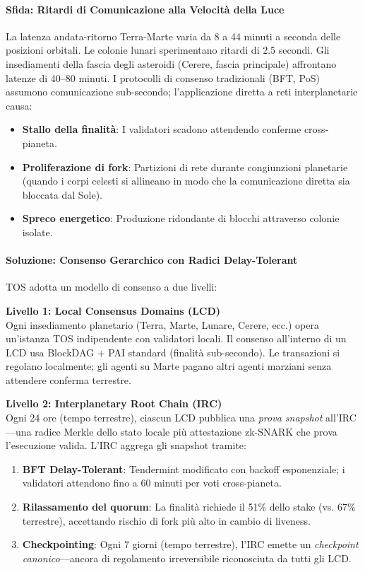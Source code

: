 \documentclass[11pt]{article}
\begin{document}
\paragraph{Sfida: Ritardi di Comunicazione alla Velocità della Luce}
La latenza andata-ritorno Terra-Marte varia da 8 a 44 minuti a seconda delle posizioni orbitali. Le colonie lunari sperimentano ritardi di 2.5 secondi. Gli insediamenti della fascia degli asteroidi (Cerere, fascia principale) affrontano latenze di 40--80 minuti. I protocolli di consenso tradizionali (BFT, PoS) assumono comunicazione sub-secondo; l'applicazione diretta a reti interplanetarie causa:
\begin{itemize}[noitemsep]
  \item \textbf{Stallo della finalità}: I validatori scadono attendendo conferme cross-pianeta.
  \item \textbf{Proliferazione di fork}: Partizioni di rete durante congiunzioni planetarie (quando i corpi celesti si allineano in modo che la comunicazione diretta sia bloccata dal Sole).
  \item \textbf{Spreco energetico}: Produzione ridondante di blocchi attraverso colonie isolate.
\end{itemize}

\paragraph{Soluzione: Consenso Gerarchico con Radici Delay-Tolerant}
TOS adotta un modello di consenso a due livelli:

\textbf{Livello 1: Local Consensus Domains (LCD)}\\
Ogni insediamento planetario (Terra, Marte, Lunare, Cerere, ecc.) opera un'istanza TOS indipendente con validatori locali. Il consenso all'interno di un LCD usa BlockDAG + PAI standard (finalità sub-secondo). Le transazioni si regolano localmente; gli agenti su Marte pagano altri agenti marziani senza attendere conferma terrestre.

\textbf{Livello 2: Interplanetary Root Chain (IRC)}\\
Ogni 24 ore (tempo terrestre), ciascun LCD pubblica una \emph{prova snapshot} all'IRC—una radice Merkle dello stato locale più attestazione zk-SNARK che prova l'esecuzione valida. L'IRC aggrega gli snapshot tramite:
\begin{enumerate}[noitemsep]
  \item \textbf{BFT Delay-Tolerant}: Tendermint modificato con backoff esponenziale; i validatori attendono fino a 60 minuti per voti cross-pianeta.
  \item \textbf{Rilassamento del quorum}: La finalità richiede il 51\% dello stake (vs. 67\% terrestre), accettando rischio di fork più alto in cambio di liveness.
  \item \textbf{Checkpointing}: Ogni 7 giorni (tempo terrestre), l'IRC emette un \emph{checkpoint canonico}—ancora di regolamento irreversibile riconosciuta da tutti gli LCD.
\end{enumerate}
\end{document}
